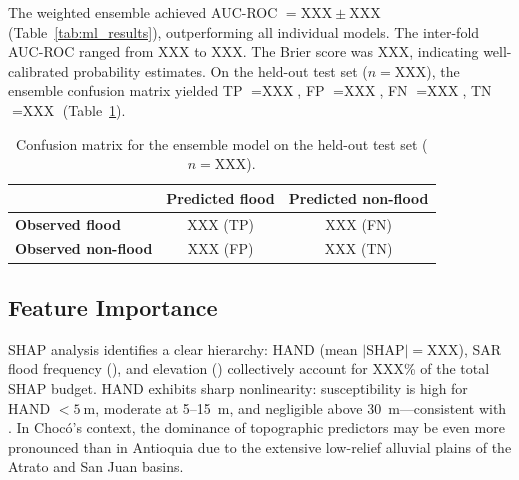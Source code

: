 \documentclass{article}
\begin{document}
The weighted ensemble achieved AUC-ROC $= \text{XXX} \pm \text{XXX}$ (Table~\ref{tab:ml_results}), outperforming all individual models. The inter-fold AUC-ROC ranged from XXX to XXX. The Brier score was XXX, indicating well-calibrated probability estimates. On the held-out test set ($n = \text{XXX}$), the ensemble confusion matrix yielded TP $= \text{XXX}$, FP $= \text{XXX}$, FN $= \text{XXX}$, TN $= \text{XXX}$ (Table~\ref{tab:confusion}).

\begin{table}[htbp]
\caption{Confusion matrix for the ensemble model on the held-out test set ($n = \text{XXX}$).}
\label{tab:confusion}
\centering
\footnotesize
\begin{tabular}{lcc}
\toprule
 & \textbf{Predicted flood} & \textbf{Predicted non-flood} \\
\midrule
\textbf{Observed flood}     & XXX (TP) & XXX (FN) \\
\textbf{Observed non-flood} & XXX (FP) & XXX (TN) \\
\bottomrule
\end{tabular}
\end{table}


\subsection{Feature Importance}

SHAP analysis identifies a clear hierarchy: HAND (mean $|$SHAP$| = \text{XXX}$), SAR flood frequency (), and elevation () collectively account for XXX\% of the total SHAP budget. HAND exhibits sharp nonlinearity: susceptibility is high for HAND $< \SI{5}{\metre}$, moderate at 5--\SI{15}{\metre}, and negligible above \SI{30}{\metre}---consistent with \citet{Garousi2019}. In Choc\'o's context, the dominance of topographic predictors may be even more pronounced than in Antioquia due to the extensive low-relief alluvial plains of the Atrato and San Juan basins.
\end{document}
